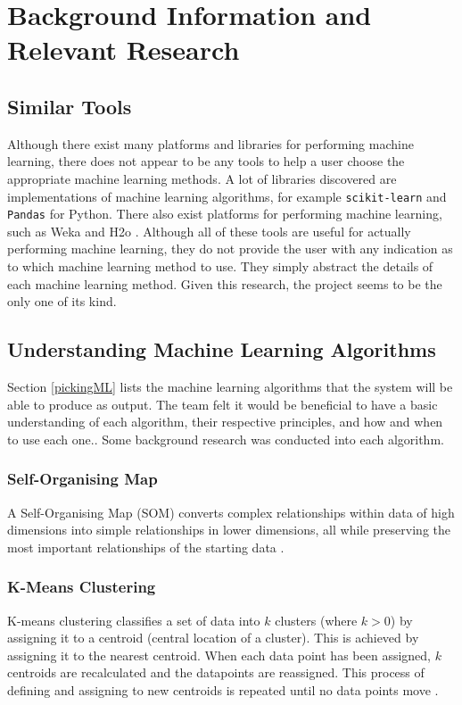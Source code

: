 \documentclass[a4paper,titlepage]{article}
\begin{document}
\section{Background Information and \\Relevant Research}

\subsection{Similar Tools}
Although there exist many platforms and libraries for performing machine learning, there does not appear to be any tools to help a user choose the appropriate machine learning methods.
A lot of libraries discovered are implementations of machine learning algorithms, for example \verb|scikit-learn| \cite{scikit-learn} and \verb|Pandas| \cite{pandas} for Python.
There also exist platforms for performing machine learning, such as Weka \cite{weka} and H2o \cite{h2o.ai}.
Although all of these tools are useful for actually performing machine learning, they do not provide the user with any indication as to which machine learning method to use.
They simply abstract the details of each machine learning method.
Given this research, the project seems to be the only one of its kind.

\subsection{Understanding Machine Learning Algorithms}
Section \ref{pickingML} lists the machine learning algorithms that the system will be able to produce as output. 
The team felt it would be beneficial to have a basic understanding of each algorithm, their respective principles, and how and when to use each one.. 
Some background research was conducted into each algorithm.

\subsubsection*{Self-Organising Map}
A Self-Organising Map (SOM) converts complex relationships within data of high dimensions into simple relationships in lower dimensions, all while preserving the most important relationships of the starting data \cite{kohonen2005}.
\subsubsection*{K-Means Clustering}
K-means clustering classifies a set of data into $k$ clusters (where $k > 0$) by assigning it to a centroid (central location of a cluster). 
This is achieved by assigning it to the nearest centroid. 
When each data point has been assigned, $k$ centroids are recalculated and the datapoints are reassigned. 
This process of defining and assigning to new centroids is repeated until no data points move \cite{kmeans}.
\end{document}
